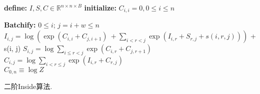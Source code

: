 \begin{algorithm}[tb]
  \begin{algorithmic}[1]
    \newlength{\commentindent}
    \setlength{\commentindent}{.3\textwidth}
    \renewcommand{\algorithmiccomment}[1]{\unskip\hfill\makebox[\commentindent][l]{$\rhd$~#1}\par}
    \LetLtxMacro{\oldalgorithmic}{\algorithmic}
    \renewcommand{\algorithmic}[1][0]{
      \oldalgorithmic[#1]
      \renewcommand{\ALC@com}[1]{
        \ifnum\pdfstrcmp{##1}{default}=0\else\algorithmiccomment{##1}\fi}%
    }
    \STATE \textbf{define:} $I,S,C \in \mathbb{R}^{n \times n \times B}$ 
    \STATE \textbf{initialize:} $C_{i, i}  = 0, 0 \le i \le n$

    \STATE \textbf{Batchify:} $0 \le i$; $j=i+w \le n$
    \STATE $I_{i, j} = \log\left(\exp\left(C_{i, i}  +  C_{j, i+1}\right) ~ +\sum\limits_{i < r < j} \exp\left(I_{i, r} + S_{r, j}+ s(i, r, j)\right)\right)$ + s(i, j)
    \STATE $S_{i, j} = \log \sum\limits_{i \le r < j} \exp\left(C_{i, r}  +  C_{j, r+1}\right) $ \\
    \STATE $C_{i, j} = \log \sum\limits_{i < r \le j} \exp\left(I_{i, r}  +  C_{r, j}\right)  $ \\
    \ENDFOR {}
    \RETURN $C_{0, n} \equiv \log Z$
  \end{algorithmic}
  \caption{二阶Inside算法.}
  \label{alg:eisner-2o}
\end{algorithm}
